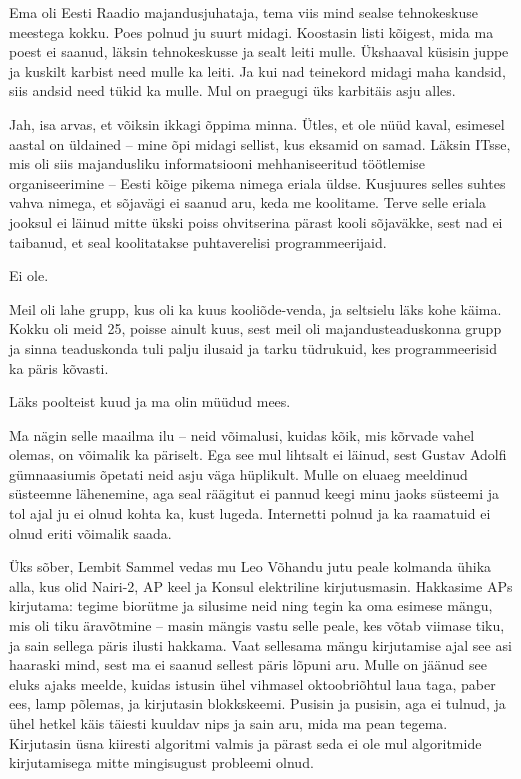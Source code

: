 
Ema oli Eesti Raadio 
majandusjuhataja, tema viis mind sealse tehnokeskuse meestega kokku. Poes 
polnud ju suurt midagi. Koostasin listi kõigest, mida ma poest ei saanud, 
läksin tehnokeskusse ja sealt leiti mulle. Ükshaaval küsisin juppe ja kuskilt 
karbist need mulle ka leiti. Ja kui nad teinekord midagi maha kandsid, siis 
andsid need tükid ka mulle. Mul on praegugi üks karbitäis asju alles.


Jah, isa arvas, et võiksin ikkagi õppima minna. Ütles, et ole nüüd kaval, esimesel 
aastal on üldained -- mine õpi midagi sellist, kus eksamid on samad. 
Läksin ITsse, mis oli siis majandusliku informatsiooni 
mehhaniseeritud töötlemise organiseerimine -- Eesti kõige pikema nimega eriala 
üldse. Kusjuures selles suhtes vahva nimega, et sõjavägi ei saanud 
aru, keda me koolitame. Terve selle eriala jooksul ei läinud mitte ükski poiss 
ohvitserina pärast kooli sõjaväkke, sest nad ei taibanud, et seal koolitatakse
puhtaverelisi programmeerijaid.


Ei ole. 

Meil oli lahe grupp, kus oli ka kuus kooliõde-venda, ja seltsielu läks kohe käima. Kokku oli meid 25, poisse ainult kuus, sest meil oli 
majandusteaduskonna grupp ja sinna teaduskonda tuli palju ilusaid ja tarku tüdrukuid, kes programmeerisid ka päris kõvasti. 

Läks poolteist kuud ja ma olin müüdud mees.


Ma nägin selle maailma ilu -- neid võimalusi, 
kuidas kõik, mis kõrvade vahel olemas, on võimalik ka päriselt. Ega see 
mul lihtsalt ei läinud, sest Gustav Adolfi gümnaasiumis õpetati 
neid asju väga hüplikult. Mulle on eluaeg meeldinud süsteemne lähenemine, 
aga seal räägitut ei pannud keegi minu jaoks süsteemi ja 
tol ajal ju ei olnud kohta ka, kust lugeda. Internetti polnud ja ka
raamatuid ei olnud eriti võimalik saada. 

Üks sõber, Lembit Sammel vedas mu Leo 
Võhandu jutu peale kolmanda ühika alla, kus olid Nairi-2, AP keel ja 
Konsul elektriline kirjutusmasin. Hakkasime APs kirjutama: tegime biorütme ja 
silusime neid ning tegin ka oma esimese mängu, mis oli tiku äravõtmine -- masin mängis vastu selle peale, kes võtab 
viimase tiku, ja sain sellega päris ilusti hakkama. Vaat 
sellesama mängu kirjutamise ajal see asi haaraski mind, sest ma ei 
saanud sellest päris lõpuni aru. Mulle on jäänud see eluks ajaks meelde, kuidas istusin ühel vihmasel oktoobriõhtul laua 
taga, paber ees, lamp põlemas, ja kirjutasin blokkskeemi. 
Pusisin ja pusisin, aga ei tulnud, ja ühel hetkel käis täiesti kuuldav nips ja sain 
aru, mida ma pean tegema. Kirjutasin üsna kiiresti algoritmi valmis ja 
pärast seda ei ole mul algoritmide kirjutamisega mitte mingisugust probleemi 
olnud. 

